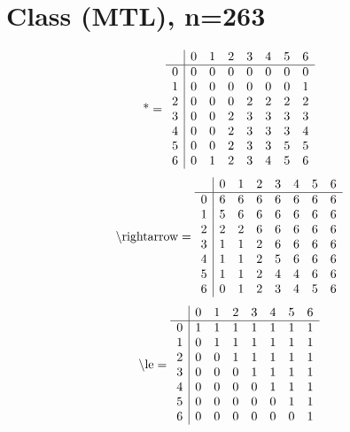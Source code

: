 \documentclass[11pt]{article}
\begin{document}
\section{Class (MTL), n=263}
\[\text{*} = 
\begin{array}{r | r r r r r r r}
 & 0 & 1 & 2 & 3 & 4 & 5 & 6 \\ \hline
0 & 0 & 0 & 0 & 0 & 0 & 0 & 0 \\
1 & 0 & 0 & 0 & 0 & 0 & 0 & 1 \\
2 & 0 & 0 & 0 & 2 & 2 & 2 & 2 \\
3 & 0 & 0 & 2 & 3 & 3 & 3 & 3 \\
4 & 0 & 0 & 2 & 3 & 3 & 3 & 4 \\
5 & 0 & 0 & 2 & 3 & 3 & 5 & 5 \\
6 & 0 & 1 & 2 & 3 & 4 & 5 & 6 \\
\end{array}
\]
\[\text{\textbackslash rightarrow} = 
\begin{array}{r | r r r r r r r}
 & 0 & 1 & 2 & 3 & 4 & 5 & 6 \\ \hline
0 & 6 & 6 & 6 & 6 & 6 & 6 & 6 \\
1 & 5 & 6 & 6 & 6 & 6 & 6 & 6 \\
2 & 2 & 2 & 6 & 6 & 6 & 6 & 6 \\
3 & 1 & 1 & 2 & 6 & 6 & 6 & 6 \\
4 & 1 & 1 & 2 & 5 & 6 & 6 & 6 \\
5 & 1 & 1 & 2 & 4 & 4 & 6 & 6 \\
6 & 0 & 1 & 2 & 3 & 4 & 5 & 6 \\
\end{array}
\]
\[\text{\textbackslash le} = 
\begin{array}{r | r r r r r r r}
 & 0 & 1 & 2 & 3 & 4 & 5 & 6 \\ \hline
0 & 1 & 1 & 1 & 1 & 1 & 1 & 1 \\
1 & 0 & 1 & 1 & 1 & 1 & 1 & 1 \\
2 & 0 & 0 & 1 & 1 & 1 & 1 & 1 \\
3 & 0 & 0 & 0 & 1 & 1 & 1 & 1 \\
4 & 0 & 0 & 0 & 0 & 1 & 1 & 1 \\
5 & 0 & 0 & 0 & 0 & 0 & 1 & 1 \\
6 & 0 & 0 & 0 & 0 & 0 & 0 & 1 \\
\end{array}
\]
\end{document}
